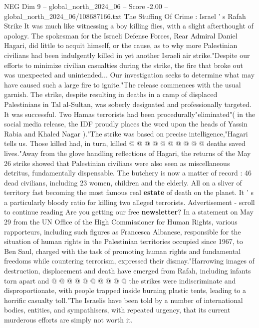 \begin{textsample}{NEG Dim 9 – global\_north\_2024\_06 – Score -2.00 – global\_north\_2024\_06/108687166.txt}  \label{ex:f9_neg_170}
The Stuffing Of Crime : Israel ' s Rafah Strike It was much like witnessing a boy killing flies, with a slight afterthought of apology.
The spokesman for the Israeli Defense Forces, Rear Admiral Daniel Hagari, did little to acquit himself, or the cause, as to why more Palestinian civilians had been indulgently killed in yet another Israeli air strike."Despite our efforts to minimize civilian casualties during the strike, the fire that broke out was unexpected and unintended...
Our investigation seeks to determine what may have caused such a large fire to ignite."The release commences with the usual garnish.
The strike, despite resulting in deaths in a camp of displaced Palestinians in Tal al-Sultan, was soberly designated and professionally targeted.
It was successful.
Two Hamas terrorists had been procedurally"eliminated"( in the social media release, the IDF proudly places the word upon the heads of Yassin Rabia and Khaled Nagar )."The strike was based on precise intelligence,"Hagari tells us.
Those killed had, in turn, killed @ @ @ @ @ @ @ @ @ @ deaths saved lives."Away from the glove handling reflections of Hagari, the returns of the May 26 strike showed that Palestinian civilians were also seen as miscellaneous detritus, fundamentally dispensable.
The butchery is now a matter of record : 46 dead civilians, including 23 women, children and the elderly.
All on a sliver of territory fast becoming the most famous real \textbf{estate} of death on the planet.
It ' s a particularly bloody ratio for killing two alleged terrorists.
Advertisement - scroll to continue reading Are you getting our free \textbf{newsletter}?
In a statement on May 29 from the UN Office of the High Commissioner for Human Rights, various rapporteurs, including such figures as Francesca Albanese, responsible for the situation of human rights in the Palestinian territories occupied since 1967, to Ben Saul, charged with the task of promoting human rights and fundamental freedoms while countering terrorism, expressed their dismay."Harrowing images of destruction, displacement and death have emerged from Rafah, including infants torn apart and @ @ @ @ @ @ @ @ @ @ the strikes were indiscriminate and disproportionate, with people trapped inside burning plastic tents, leading to a horrific casualty toll."The Israelis have been told by a number of international bodies, entities, and sympathisers, with repeated urgency, that its current murderous efforts are simply not worth it.

\end{textsample}
